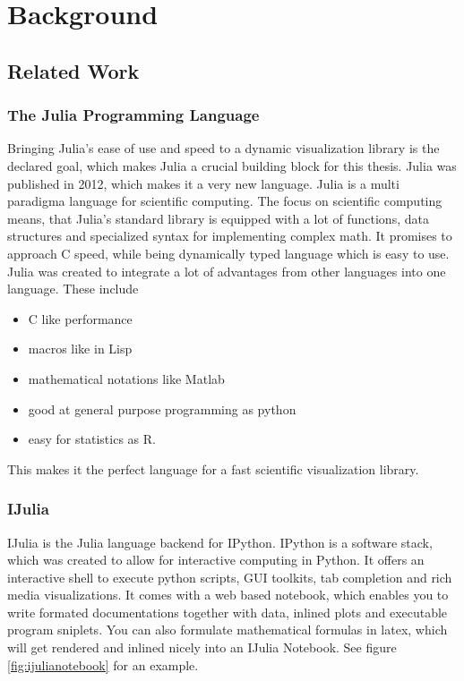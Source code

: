 \section{Background}


\subsection{Related Work}


\subsubsection{The Julia Programming Language}
Bringing Julia's ease of use and speed to a dynamic visualization library is the declared goal, which makes Julia a crucial building block for this thesis.
Julia was published in 2012, which makes it a very new language.
Julia is a multi paradigma language for scientific computing.
The focus on scientific computing means, that Julia's standard library is equipped with a lot of functions, data structures and specialized syntax for implementing complex math.
It promises to approach C speed, while being dynamically typed language which is easy to use.
Julia was created to integrate a lot of advantages from other languages into one language.
These include \cite{WhyJulia}
\begin{itemize}
	\item C like performance 
	\item macros like in Lisp
	\item mathematical notations like Matlab
	\item good at general purpose programming as python
	\item easy for statistics as R.
\end{itemize}
This makes it the perfect language for a fast scientific visualization library.

\subsubsection{IJulia}
IJulia is the Julia language backend for IPython.
IPython is a software stack, which was created to allow for interactive computing in Python.
It offers an interactive shell to execute python scripts, \ac{GUI} toolkits, tab completion and rich media visualizations.
It comes with a web based notebook, which enables you to write formated documentations together with data, inlined plots and executable program sniplets. You can also formulate mathematical formulas in latex, which will get rendered and inlined nicely into an IJulia Notebook.
See figure \ref{fig:ijulianotebook} for an example.


